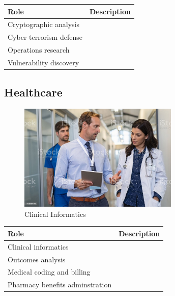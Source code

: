 \begin{table}[H]
	\begin{center}
		\begin{tabular}{p{1.3in}|p{3in}} 
			\textbf{Role} & \textbf{Description}\\
			\hline
			Cryptographic analysis & \\
			\hline
			Cyber terrorism defense & \\
			\hline
			Operations research & \\
			\hline
			Vulnerability discovery & \\
		\end{tabular}
	\end{center}
\end{table}

\subsection{Healthcare}

\begin{figure}[H]
	\begin{center}
		\caption{Clinical Informatics}
		\vskip 4pt
		\includegraphics[height=2in]{images/careers/istockphoto-1189303763-1024x1024.jpg}
	\end{center}
\end{figure}

\begin{table}[H]
	\begin{center}
		\begin{tabular}{p{1.3in}|p{3in}} 
			\textbf{Role} & \textbf{Description}\\
			\hline
			Clinical informatics & \\
			\hline
			Outcomes analysis & \\
			\hline
			Medical coding and billing & \\
			\hline
			Pharmacy benefits adminstration & \\
		\end{tabular}
	\end{center}
\end{table}

